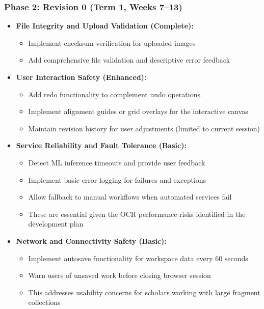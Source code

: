 \documentclass{article}
\begin{document}
\subsubsection{Phase 2: Revision 0 (Term 1, Weeks 7--13)}
\begin{itemize}
    \item \textbf{File Integrity and Upload Validation (Complete):}
    \begin{itemize}
        \item Implement checksum verification for uploaded images
        \item Add comprehensive file validation and descriptive error feedback
    \end{itemize}

    \item \textbf{User Interaction Safety (Enhanced):}
    \begin{itemize}
        \item Add redo functionality to complement undo operations
        \item Implement alignment guides or grid overlays for the interactive canvas
        \item Maintain revision history for user adjustments (limited to current session)
    \end{itemize}

    \item \textbf{Service Reliability and Fault Tolerance (Basic):}
    \begin{itemize}
        \item Detect ML inference timeouts and provide user feedback
        \item Implement basic error logging for failures and exceptions
        \item Allow fallback to manual workflows when automated services fail
        \item These are essential given the OCR performance risks identified in the development plan
    \end{itemize}

    \item \textbf{Network and Connectivity Safety (Basic):}
    \begin{itemize}
        \item Implement autosave functionality for workspace data every 60 seconds
        \item Warn users of unsaved work before closing browser session
        \item This addresses usability concerns for scholars working with large fragment collections
    \end{itemize}


\end{itemize}
\end{document}
